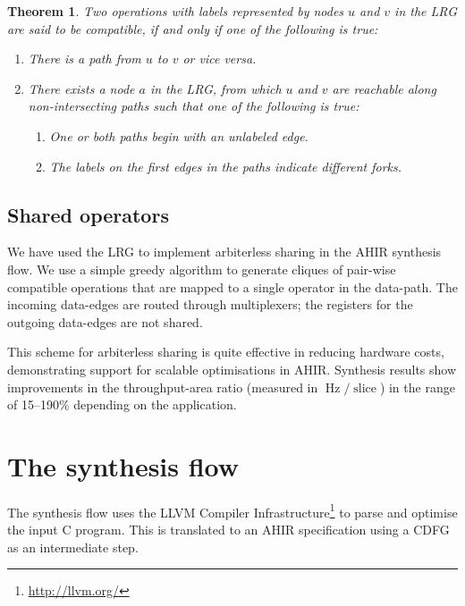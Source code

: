 \documentclass[conference]{IEEEtran}
\newtheorem{theorem}{Theorem}[section]
\begin{document}
\begin{theorem}

  Two operations with labels represented by nodes $u$ and $v$ in the
  LRG are said to be compatible, if and only if one of the following
  is true:

\begin{enumerate}
  \item There is a path from $u$ to $v$ or \emph{vice versa}.
  \item There exists a node $a$ in the LRG, from which $u$ and $v$ are
        reachable along non-intersecting paths such that one of the
        following is true:
    \begin{enumerate}
      \item One or both paths begin with an unlabeled edge.
      \item The labels on the first edges in the paths indicate
            different forks.
    \end{enumerate}
\end{enumerate}
\label{theorem:compatibility-LRG}
\end{theorem}

\subsection{Shared operators}

We have used the LRG to implement arbiterless sharing in the AHIR
synthesis flow. We use a simple greedy algorithm to generate cliques
of pair-wise compatible operations that are mapped to a single
operator in the data-path. The incoming data-edges are routed through
multiplexers; the registers for the outgoing data-edges are not
shared.

This scheme for arbiterless sharing is quite effective in reducing
hardware costs, demonstrating support for scalable optimisations in
AHIR. Synthesis results show improvements in the throughput-area ratio
(measured in $\operatorname{Hz}/\operatorname{slice}$) in the range of
15--190\% depending on the application\cite{ahir_thesis}.

\section{The synthesis flow}

The synthesis flow uses the LLVM Compiler
Infrastructure\footnote{\url{http://llvm.org/}} to parse and optimise
the input C program. This is translated to an AHIR specification using
a CDFG as an intermediate step.
\end{document}
